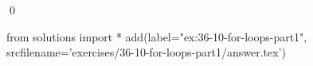 
\begin{ex}
  \label{ex:36-10-for-loops-part1}
  
  \qed
\end{ex}
\begin{python0}
from solutions import *
add(label="ex:36-10-for-loops-part1",
    srcfilename='exercises/36-10-for-loops-part1/answer.tex')
\end{python0}

